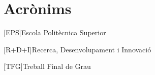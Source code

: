 \chapter{Acrònims} %
%
%
\begin{acronym}

[EPS]{Escola Politècnica Superior}

[R+D+I]{Recerca, Desenvolupament i Innovació}

[TFG]{Treball Final de Grau}


\end{acronym}

